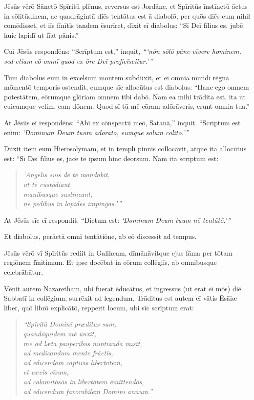 \Caput
\Versus Jēsūs vērō Sānctō Spīritū plēnus, reversus est Jordāne, et Spīritūs īnstīnctū āctus in sōlitūdinem,
\Versus ac quadrāgintā diēs tentātus est ā diabolō, per quōs diēs cum nihil comēdisset, et iīs fīnītīs tandem ēsurīret,
\Versus dīxit eī diabolus: ``Sī Deī fīlius es, jubē huic lapidī ut fīat pānis.''

\Versus Cui Jēsūs respondēns: ``Scrīptum est,'' inquit, \emph{``{}`nōn sōlō pāne vīvere hominem, sed etiam eō omnī quod ex ōre Deī proficīscitur.'{}''}

\Versus Tum diabolus eum in excelsum montem subdūxit, et eī omnia mundī rēgna mōmen\-tō temporis ostendit,
\Versus eumque sīc allocūtus est diabolus: ``Hanc ego omnem potestātem, eōrumque glōriam omnem tibi dabō. Nam ea mihi trādita est, ita ut cuicumque velim, eam dōnem.
\Versus Quod sī tū mē cōram adōrāveris, erunt omnia tua.''

\Versus At Jēsūs eī respondēns: ``Abī ex cōnspectū meō, Satanā,'' inquit. ``Scrīptum est enim: \emph{`Dominum Deum tuum adōrātō, eumque sōlum colitō.'{}''}

\Versus Dūxit item eum Hierosolymam, et in templī pinnīs collocāvit, atque ita allocūtus est: ``Sī Deī fīlius es, jacē tē ipsum hinc deorsum.
\Versus Nam ita scrīptum est:
\begin{verse}
\begin{patverse*}
\emph{`Angelīs suīs dē tē mandābit,\\
ut tē cūstōdiant,}\\
\Versus \emph{manibusque sustineant,\\
nē pedibus in lapidēs impingās.'{}''}
\end{patverse*}
\end{verse}


\Versus At Jēsūs sīc eī respondit: ``Dictum est: \emph{`Dominum Deum tuum nē tentātō.'{}''}

\Versus Et diabolus, perāctā omnī tentātiōne, ab eō discessit ad tempus.

\Versus Jēsūs vērō vī Spīritūs rediit in Galilæam, dīmānāvitque ejus fāma per tōtam regiōnem fīnitimam.
\Versus Et ipse docēbat in eōrum collēgiīs, ab omnibusque celebrābātur.

\Versus Vēnit autem Nazaretham, ubi fuerat ēducātus, et ingressus (ut erat eī mōs) diē Sabbatī in collēgium, surrēxit ad legendum.
\Versus Trāditus est autem eī vātis Ēsāiæ liber, quō librō explicātō, repperit locum, ubi sīc scrīptum erat:
\begin{verse}
\begin{patverse*}
\Versus \emph{``Spīritū Dominī præditus sum,\\
quandōquidem mē ūnxit,\\
mē ad læta pauperibus nūntianda mīsit,\\
ad medicandum mente frāctīs,\\
ad ēdīcendam captīvīs lībertātem,\\
et cæcīs vīsum,\\
ad calamitōsōs in lībertātem ēmittendōs,}\\
\Versus \emph{ad ēdīcendum favōrābilem Dominī annum.''}
\end{patverse*}
\end{verse}

